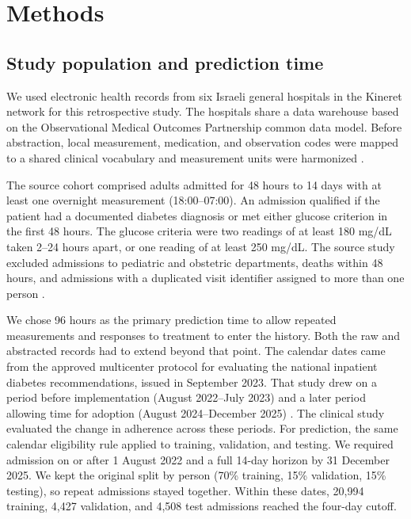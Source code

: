 \section{Methods}
\label{sec:methods}

\subsection{Study population and prediction time}
We used electronic health records from six Israeli general hospitals in the Kineret network for this retrospective study. The hospitals share a data warehouse based on the Observational Medical Outcomes Partnership common data model. Before abstraction, local measurement, medication, and observation codes were mapped to a shared clinical vocabulary and measurement units were harmonized \citep{oded2027kineret-jbi}.

The source cohort comprised adults admitted for 48 hours to 14 days with at least one overnight measurement (18:00--07:00). An admission qualified if the patient had a documented diabetes diagnosis or met either glucose criterion in the first 48 hours. The glucose criteria were two readings of at least 180 mg/dL taken 2--24 hours apart, or one reading of at least 250 mg/dL. The source study excluded admissions to pediatric and obstetric departments, deaths within 48 hours, and admissions with a duplicated visit identifier assigned to more than one person \citep{oded2027kineret-jbi}.

We chose 96 hours as the primary prediction time to allow repeated measurements and responses to treatment to enter the history. Both the raw and abstracted records had to extend beyond that point. The calendar dates came from the approved multicenter protocol for evaluating the national inpatient diabetes recommendations, issued in September 2023. That study drew on a period before implementation (August 2022--July 2023) and a later period allowing time for adoption (August 2024--December 2025) \citep{hochberg2023inpatient,oded2027kineret-jbi}. The clinical study evaluated the change in adherence across these periods. For prediction, the same calendar eligibility rule applied to training, validation, and testing. We required admission on or after 1 August 2022 and a full 14-day horizon by 31 December 2025. We kept the original split by person (70\% training, 15\% validation, 15\% testing), so repeat admissions stayed together. Within these dates, 20,994 training, 4,427 validation, and 4,508 test admissions reached the four-day cutoff.


